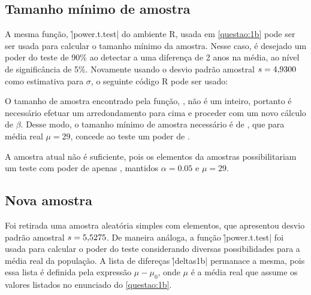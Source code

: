 



\subsection{Tamanho mínimo de amostra}
\label{questao:1c}

A mesma função, \r|power.t.test| do ambiente R, usada em \autoref{questao:1b} pode ser ser usada para calcular o tamanho mínimo da amostra. Nesse caso, é desejado um poder do teste de 90\% ao detectar a uma diferença de 2 anos na média, ao nível de significância de 5\%. Novamente usando o desvio padrão amostral $s = \num{4.9300}$ como estimativa para $\sigma$, o seguinte código R pode ser usado:


O tamanho de amostra encontrado pela função, \UMCn, não é um inteiro, portanto é necessário efetuar um arredondamento para cima e proceder com um novo cálculo de $\beta$. Desse modo, o tamanho mínimo de amostra necessário é de \UMCnMin, que para média real $\mu = 29$, concede ao teste um poder de \UMCbeta.

A amostra atual não é suficiente, pois os \UMAn elementos da amostras possibilitariam um teste com poder de apenas \UMCbetaOld, mantidos $\alpha = 0.05$ e $\mu = 29$.

\subsection{Nova amostra}
\label{questao:1d}

Foi retirada uma amostra aleatória simples com \UMCnMin elementos, que apresentou desvio padrão amostral $s = \num{5.5275}$. De maneira análoga, a função \r|power.t.test| foi usada para calcular o poder do teste considerando diversas possibilidades para a média real da população. A lista de difereças \r|deltas1b|  permanace a mesma, pois essa lista é definida pela expressão $\mu - \mu_0$, onde $\mu$ é a média real que assume os valores listados no enunciado do \autoref{questao:1b}.

